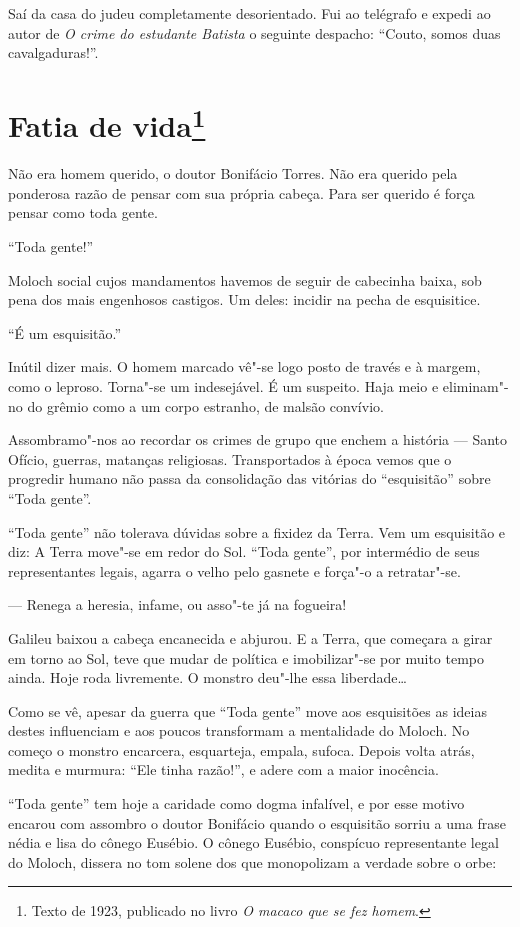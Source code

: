 Saí da casa do judeu completamente desorientado. Fui ao telégrafo e
expedi ao autor de \emph{O crime do estudante Batista} o seguinte
despacho: ``Couto, somos duas cavalgaduras!''.

\chapter{Fatia de vida\footnote[*]{Texto de 1923, publicado no livro \emph{O macaco que se fez homem}.}}


Não era homem querido, o doutor Bonifácio Torres. Não era querido pela
ponderosa razão de pensar com sua própria cabeça. Para ser querido é
força pensar como toda gente.

``Toda gente!''

Moloch social cujos mandamentos havemos de seguir de cabecinha baixa,
sob pena dos mais engenhosos castigos. Um deles: incidir na pecha de
esquisitice.

``É um esquisitão.''

Inútil dizer mais. O homem marcado vê"-se logo posto de través e à
margem, como o leproso. Torna"-se um indesejável. É um suspeito. Haja
meio e eliminam"-no do grêmio como a um corpo estranho, de malsão
convívio.

Assombramo"-nos ao recordar os crimes de grupo que enchem a história ---
Santo Ofício, guerras, matanças religiosas. Transportados à época vemos
que o progredir humano não passa da consolidação das vitórias do
``esquisitão'' sobre ``Toda gente''.

``Toda gente'' não tolerava dúvidas sobre a fixidez da Terra. Vem um
esquisitão e diz: A Terra move"-se em redor do Sol. ``Toda gente'', por
intermédio de seus representantes legais, agarra o velho pelo gasnete e
força"-o a retratar"-se.

--- Renega a heresia, infame, ou asso"-te já na fogueira!

Galileu baixou a cabeça encanecida e abjurou. E a Terra, que começara a
girar em torno ao Sol, teve que mudar de política e imobilizar"-se por
muito tempo ainda. Hoje roda livremente. O monstro deu"-lhe essa
liberdade\ldots{}

Como se vê, apesar da guerra que ``Toda gente'' move aos esquisitões as
ideias destes influenciam e aos poucos transformam a mentalidade do
Moloch. No começo o monstro encarcera, esquarteja, empala, sufoca.
Depois volta atrás, medita e murmura: ``Ele tinha razão!'', e adere com
a maior inocência.

``Toda gente'' tem hoje a caridade como dogma infalível, e por esse
motivo encarou com assombro o doutor Bonifácio quando o esquisitão
sorriu a uma frase nédia e lisa do cônego Eusébio. O cônego Eusébio,
conspícuo representante legal do Moloch, dissera no tom solene dos que
monopolizam a verdade sobre o orbe:

